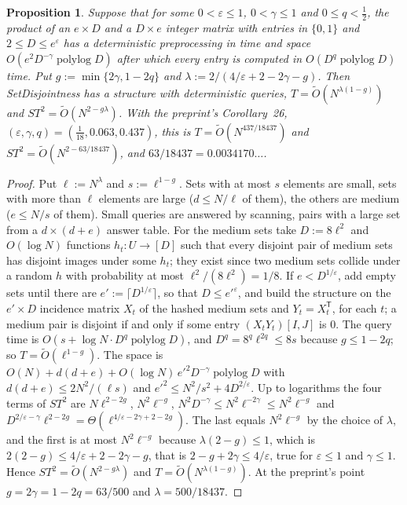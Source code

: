 \documentclass[11pt]{article}
\newtheorem{proposition}[theorem]{Proposition}
\theoremstyle{definition}
\theoremstyle{remark}
\DeclareMathOperator{\polylog}{polylog}
\begin{document}
\begin{proposition}\label{m:prop:setdisjone}
Suppose that for some $0<\varepsilon\le1$, $0<\gamma\le1$ and $0\le q<\frac12$, the product of an $e\times D$ and a $D\times e$ integer matrix with entries in $\{0,1\}$ and $2\le D\le e^\varepsilon$ has a deterministic preprocessing in time and space $O(e^2D^{-\gamma}\polylog D)$ after which every entry is computed in $O(D^q\polylog D)$ time. Put $g:=\min\{2\gamma,1-2q\}$ and $\lambda:=2/(4/\varepsilon+2-2\gamma-g)$. Then SetDisjointness has a structure with deterministic queries, $T=\tilde O(N^{\lambda(1-g)})$ and $ST^2=\tilde O(N^{2-g\lambda})$. With the preprint's Corollary~26, $(\varepsilon,\gamma,q)=(\frac1{18},0.063,0.437)$, this is $T=\tilde O(N^{437/18437})$ and $ST^2=\tilde O(N^{2-63/18437})$, and $63/18437=0.0034170\ldots$.
\end{proposition}

\begin{proof}
Put $\ell:=N^\lambda$ and $s:=\ell^{1-g}$. Sets with at most $s$ elements are small, sets with more than $\ell$ elements are large ($d\le N/\ell$ of them), the others are medium ($e\le N/s$ of them). Small queries are answered by scanning, pairs with a large set from a $d\times(d+e)$ answer table. For the medium sets take $D:=8\ell^2$ and $O(\log N)$ functions $h_t\colon U\to[D]$ such that every disjoint pair of medium sets has disjoint images under some $h_t$; they exist since two medium sets collide under a random $h$ with probability at most $\ell^2/(8\ell^2)=1/8$. If $e<D^{1/\varepsilon}$, add empty sets until there are $e':=\lceil D^{1/\varepsilon}\rceil$, so that $D\le e'^\varepsilon$, and build the structure on the $e'\times D$ incidence matrix $X_t$ of the hashed medium sets and $Y_t=X_t^{\mathsf T}$, for each $t$; a medium pair is disjoint if and only if some entry $(X_tY_t)[I,J]$ is $0$. The query time is $O(s+\log N\cdot D^q\polylog D)$, and $D^q=8^q\ell^{2q}\le8s$ because $g\le1-2q$; so $T=\tilde O(\ell^{1-g})$. The space is $O(N)+d(d+e)+O(\log N)\,e'^2D^{-\gamma}\polylog D$ with $d(d+e)\le2N^2/(\ell s)$ and $e'^2\le N^2/s^2+4D^{2/\varepsilon}$. Up to logarithms the four terms of $ST^2$ are $N\ell^{2-2g}$, $N^2\ell^{-g}$, $N^2D^{-\gamma}\le N^2\ell^{-2\gamma}\le N^2\ell^{-g}$ and $D^{2/\varepsilon-\gamma}\ell^{2-2g}=\Theta(\ell^{4/\varepsilon-2\gamma+2-2g})$. The last equals $N^2\ell^{-g}$ by the choice of $\lambda$, and the first is at most $N^2\ell^{-g}$ because $\lambda(2-g)\le1$, which is $2(2-g)\le4/\varepsilon+2-2\gamma-g$, that is $2-g+2\gamma\le4/\varepsilon$, true for $\varepsilon\le1$ and $\gamma\le1$. Hence $ST^2=\tilde O(N^{2-g\lambda})$ and $T=\tilde O(N^{\lambda(1-g)})$. At the preprint's point $g=2\gamma=1-2q=63/500$ and $\lambda=500/18437$.
\end{proof}
\end{document}

